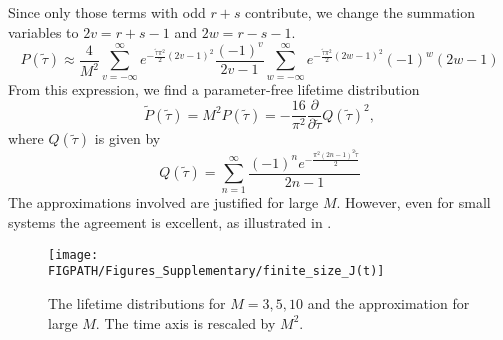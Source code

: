 Since only those terms with odd $r+s$ contribute, we change the summation variables to $2v=r+s-1$ and $2w=r-s-1$.
\begin{equation}
 P(\tilde\tau)\approx\frac{4}{M^2}\sum_{v=-\infty}^{\infty}e^{-\frac{\tilde\tau\pi^2}{2}\left(2v-1\right)^2}\frac{(-1)^{v}}{2v-1}\sum_{w=-\infty}^{\infty}e^{-\frac{\tilde\tau\pi^2}{2}\left(2w-1\right)^2}(-1)^{w}(2w-1)
\end{equation}
From this expression, we find a parameter-free lifetime distribution
\begin{equation}
  \tilde{P}(\tilde\tau)=M^2P(\tilde\tau)=-\frac{16}{\pi^2}\frac{\partial }{\partial \tilde\tau}Q(\tilde\tau)^2,
\end{equation}
where $Q(\tilde\tau)$ is given by
\begin{equation}
  Q(\tilde\tau)=\sum_{n=1}^{\infty}\frac{(-1)^ne^{-\frac{\pi^2 (2n-1)^2 \tilde\tau}{2}}}{2n-1}
\end{equation}
The approximations involved are justified for large $M$. However, even for small systems the 
agreement is excellent, as illustrated in .
\begin{figure}
\centering
\texttt{[image: \\FIGPATH/Figures\_Supplementary/finite\_size\_J(t)]}
\caption[Supp.: The lifetime distribution of two random walkers.]
{\label{fig:lifetime}The lifetime distributions for $M=3,5,10$ and the approximation for large $M$. The time axis is rescaled by $M^2$.}
\end{figure}

